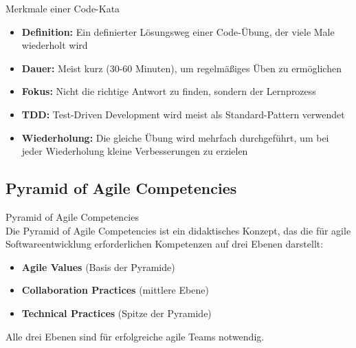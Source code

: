 \begin{concept}{Merkmale einer Code-Kata}\\
    \begin{itemize}
        \item \textbf{Definition:} Ein definierter Lösungsweg einer Code-Übung, der viele Male wiederholt wird
        \item \textbf{Dauer:} Meist kurz (30-60 Minuten), um regelmäßiges Üben zu ermöglichen
        \item \textbf{Fokus:} Nicht die richtige Antwort zu finden, sondern der Lernprozess
        \item \textbf{TDD:} Test-Driven Development wird meist als Standard-Pattern verwendet
        \item \textbf{Wiederholung:} Die gleiche Übung wird mehrfach durchgeführt, um bei jeder Wiederholung kleine Verbesserungen zu erzielen
    \end{itemize}
\end{concept}

\subsection{Pyramid of Agile Competencies}

\begin{definition}{Pyramid of Agile Competencies}\\
    Die Pyramid of Agile Competencies ist ein didaktisches Konzept, das die für agile Softwareentwicklung erforderlichen Kompetenzen auf drei Ebenen darstellt:
    \begin{itemize}
        \item \textbf{Agile Values} (Basis der Pyramide)
        \item \textbf{Collaboration Practices} (mittlere Ebene)
        \item \textbf{Technical Practices} (Spitze der Pyramide)
    \end{itemize}
    Alle drei Ebenen sind für erfolgreiche agile Teams notwendig.
\end{definition}

